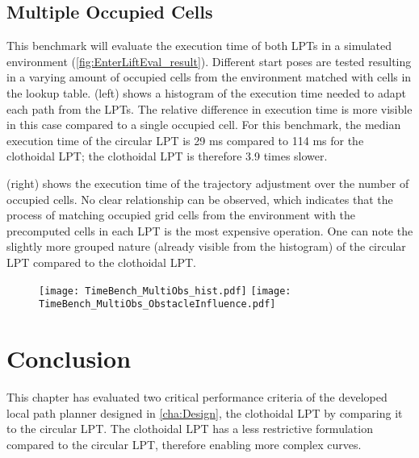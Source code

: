\subsection{Multiple Occupied Cells} \label{sec:EvalTimeMulti}
This benchmark will evaluate the execution time of both LPTs in a simulated environment (\cref{fig:EnterLiftEval_result}). Different start poses are tested resulting in a varying amount of occupied cells from the environment matched with cells in the lookup table.  (left) shows a histogram of the execution time needed to adapt each path from the LPTs. The relative difference in execution time is more visible in this case compared to a single occupied cell. For this benchmark, the median execution time of the circular LPT is 29 ms compared to 114 ms for the clothoidal LPT; the clothoidal LPT is therefore 3.9 times slower.

 (right) shows the execution time of the trajectory adjustment over the number of occupied cells. No clear relationship can be observed, which indicates that the process of matching occupied grid cells from the environment with the precomputed cells in each LPT is the most expensive operation. One can note the slightly more grouped nature (already visible from the histogram) of the circular LPT compared to the clothoidal LPT.

\begin{figure}[!htbp]
	\centering
	\texttt{[image: TimeBench\_MultiObs\_hist.pdf]}
    \hfill
	\texttt{[image: TimeBench\_MultiObs\_ObstacleInfluence.pdf]}
\end{figure}
\newpage

\section{Conclusion} \label{sec:EvalConc}
This chapter has evaluated two critical performance criteria of the developed local path planner designed in \cref{cha:Design}, the clothoidal LPT by comparing it to the circular LPT. The clothoidal LPT has a less restrictive formulation compared to the circular LPT, therefore enabling more complex curves. 


